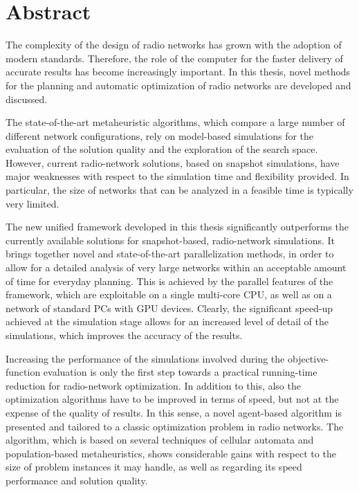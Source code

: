 
\chapter*{Abstract}

The complexity of the design of radio networks has grown with the
adoption of modern standards. Therefore, the role of the computer
for the faster delivery of accurate results has become increasingly
important. In this thesis, novel methods for the planning and automatic
optimization of radio networks are developed and discussed.

The state-of-the-art metaheuristic algorithms, which compare a large
number of different network configurations, rely on model-based simulations
for the evaluation of the solution quality and the exploration of
the search space. However, current radio-network solutions, based
on snapshot simulations, have major weaknesses with respect to the
simulation time and flexibility provided. In particular, the size
of networks that can be analyzed in a feasible time is typically very
limited.

The new unified framework developed in this thesis significantly outperforms
the currently available solutions for snapshot-based, radio-network
simulations. It brings together novel and state-of-the-art parallelization
methods, in order to allow for a detailed analysis of very large networks
within an acceptable amount of time for everyday planning. This is
achieved by the parallel features of the framework, which are exploitable
on a single multi-core CPU, as well as on a network of standard PCs
with GPU devices. Clearly, the significant speed-up achieved at the
simulation stage allows for an increased level of detail of the simulations,
which improves the accuracy of the results.

Increasing the performance of the simulations involved during the
objective-function evaluation is only the first step towards a practical
running-time reduction for radio-network optimization. In addition
to this, also the optimization algorithms have to be improved in terms
of speed, but not at the expense of the quality of results. In this
sense, a novel agent-based algorithm is presented and tailored to
a classic optimization problem in radio networks. The algorithm, which
is based on several techniques of cellular automata and population-based
metaheuristics, shows considerable gains with respect to the size
of problem instances it may handle, as well as regarding its speed
performance and solution quality.

